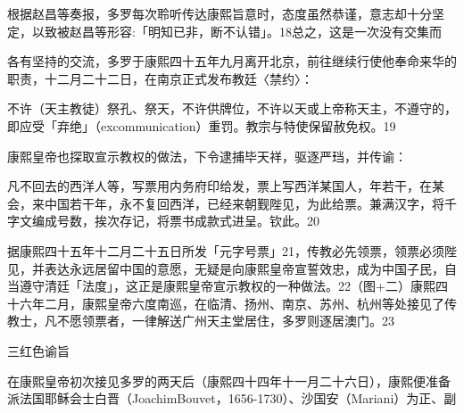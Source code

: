 根据赵昌等奏报，多罗每次聆听传达康熙旨意时，态度虽然恭谨，意志却十分坚定，以致被赵昌等形容:「明知已非，断不认错」。18总之，这是一次没有交集而

\vfill
\begin{BookNotes}
\end{BookNotes}


\noindent 各有坚持的交流，多罗于康熙四十五年九月离开北京，前往继续行使他奉命来华的职责，十二月二十二日，在南京正式发布教廷〈禁约〉：

\begin{BookQuote}
不许（天主教徒）祭孔、祭天，不许供牌位，不许以天或上帝称天主，不遵守的，即应受「弃绝」（excommunication）重罚。教宗与特使保留赦免权。19
\end{BookQuote}

康熙皇帝也探取宣示教权的做法，下令逮捕毕天祥，驱逐严珰，并传谕：

\begin{BookQuote}
凡不回去的西洋人等，写票用内务府印给发，票上写西洋某国人，年若干，在某会，来中国若干年，永不复回西洋，已经来朝觐陛见，为此给票。兼满汉字，将千字文编成号数，挨次存记，将票书成款式进呈。钦此。20
\end{BookQuote}

据康熙四十五年十二月二十五日所发「元字号票」21，传教必先领票，领票必须陛见，并表达永远居留中国的意愿，无疑是向康熙皇帝宣誓效忠，成为中国子民，自当遵守清廷「法度」，这正是康熙皇帝宣示教权的一种做法。22（图+二）康熙四十六年二月，康熙皇帝六度南巡，在临清、扬州、南京、苏州、杭州等处接见了传教士，凡不愿领票者，一律解送广州天主堂居住，多罗则逐居澳门。23

三红色谕旨

在康熙皇帝初次接见多罗的两天后（康熙四十四年十一月二十六日），康熙便准备派法国耶稣会士白晋（JoachimBouvet，1656-1730）、沙国安（Mariani）为正、副

